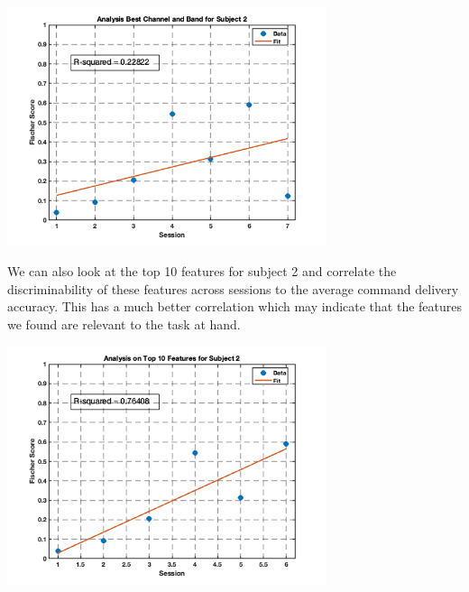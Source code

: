 \documentclass[12pt]{article}
\begin{document}
\begin{center}
    \includegraphics[width=0.7\textwidth]{2_5.png}
\end{center}

We can also look at the top 10 features for subject 2 and correlate the discriminability of these features across sessions to the average command delivery accuracy. This has a much better correlation which may indicate that the features we found are relevant to the task at hand.

\begin{center}
    \includegraphics[width=0.7\textwidth]{2_6.png}
\end{center}
\end{document}

